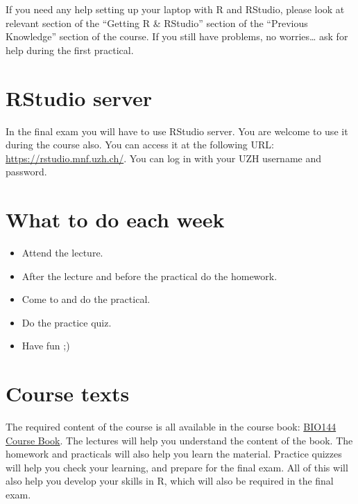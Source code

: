 \documentclass[
  letterpaper,
  8pt,
  a4paper]{book}
\begin{document}
If you need any help setting up your laptop with R and RStudio, please
look at relevant section of the ``Getting R \& RStudio'' section of the
``Previous Knowledge'' section of the course. If you still have
problems, no worries\ldots{} ask for help during the first practical.

\section*{RStudio server}\label{rstudio-server}


In the final exam you will have to use RStudio server. You are welcome
to use it during the course also. You can access it at the following
URL: \url{https://rstudio.mnf.uzh.ch/}. You can log in with your UZH
username and password.

\section*{What to do each week}\label{what-to-do-each-week}


\begin{itemize}
\item
  Attend the lecture.
\item
  After the lecture and before the practical do the homework.
\item
  Come to and do the practical.
\item
  Do the practice quiz.
\item
  Have fun ;)
\end{itemize}

\section*{Course texts}\label{course-texts}


The required content of the course is all available in the course book:
\href{https://opetchey.github.io/BIO144_Course_Book/}{BIO144 Course
Book}. The lectures will help you understand the content of the book.
The homework and practicals will also help you learn the material.
Practice quizzes will help you check your learning, and prepare for the
final exam. All of this will also help you develop your skills in R,
which will also be required in the final exam.
\end{document}
